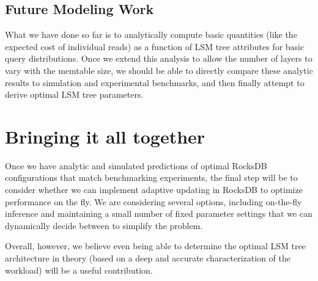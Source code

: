 \documentclass{sig-alternate-05-2015}
\begin{document}

\subsection{Future Modeling Work}

What we have done so far is to analytically compute basic quantities (like the
expected cost of individual reads) as a function of LSM tree attributes for
basic query distributions. Once we extend this analysis to allow the number of
layers to vary with the memtable size, we should be able to directly compare
these analytic results to simulation and experimental benchmarks, and then
finally attempt to derive optimal LSM tree parameters.

\section{Bringing it all together}

Once we have analytic and simulated predictions of optimal RocksDB
configurations that match benchmarking experiments, the final step will be to
consider whether we can implement adaptive updating in RocksDB to optimize
performance on the fly. We are considering several options, including on-the-fly
inference and maintaining a small number of fixed parameter settings that we can
dynamically decide between to simplify the problem.

Overall, however, we believe even being able to determine the optimal LSM tree
architecture in theory (based on a deep and accurate characterization of the
workload) will be a useful contribution.


\small

\end{document}
